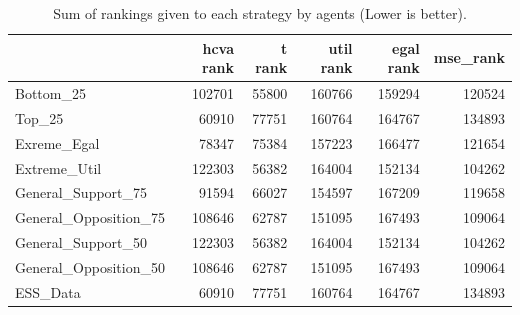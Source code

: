 \begin{table}
\caption{Sum of rankings given to each strategy by agents (Lower is better).}
\begin{tabular}{lrrrrr}
\toprule
 & hcva rank & t rank & util rank & egal rank & mse_rank \\
\midrule
Bottom_25 & 102701 & 55800 & 160766 & 159294 & 120524 \\
Top_25 & 60910 & 77751 & 160764 & 164767 & 134893 \\
Exreme_Egal & 78347 & 75384 & 157223 & 166477 & 121654 \\
Extreme_Util & 122303 & 56382 & 164004 & 152134 & 104262 \\
General_Support_75 & 91594 & 66027 & 154597 & 167209 & 119658 \\
General_Opposition_75 & 108646 & 62787 & 151095 & 167493 & 109064 \\
General_Support_50 & 122303 & 56382 & 164004 & 152134 & 104262 \\
General_Opposition_50 & 108646 & 62787 & 151095 & 167493 & 109064 \\
ESS_Data & 60910 & 77751 & 160764 & 164767 & 134893 \\
\bottomrule
\end{tabular}
\end{table}
